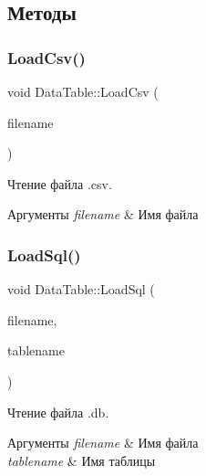 \subsection{Методы}
\mbox{\label{class_data_table_af46ecb3f9f33e2a34ec9866991cd12ff}} 
\subsubsection{\texorpdfstring{Load\+Csv()}{LoadCsv()}}
{\footnotesize\ttfamily void Data\+Table\+::\+Load\+Csv (\begin{DoxyParamCaption}\item[{Q\+String}]{filename }\end{DoxyParamCaption})}



Чтение файла .csv. 


\begin{DoxyParams}{Аргументы}
{\em filename} & Имя файла \\
\hline
\end{DoxyParams}
\mbox{\label{class_data_table_ab9cbaf9a296c84eb4c969870d83a6555}} 
\subsubsection{\texorpdfstring{Load\+Sql()}{LoadSql()}}
{\footnotesize\ttfamily void Data\+Table\+::\+Load\+Sql (\begin{DoxyParamCaption}\item[{Q\+String}]{filename,  }\item[{Q\+String}]{tablename }\end{DoxyParamCaption})}



Чтение файла .db. 


\begin{DoxyParams}{Аргументы}
{\em filename} & Имя файла \\
\hline
{\em tablename} & Имя таблицы \\
\hline
\end{DoxyParams}
\mbox{\label{class_data_table_afb7a2b7446f518aa5fe208dc6df1f686}} 
